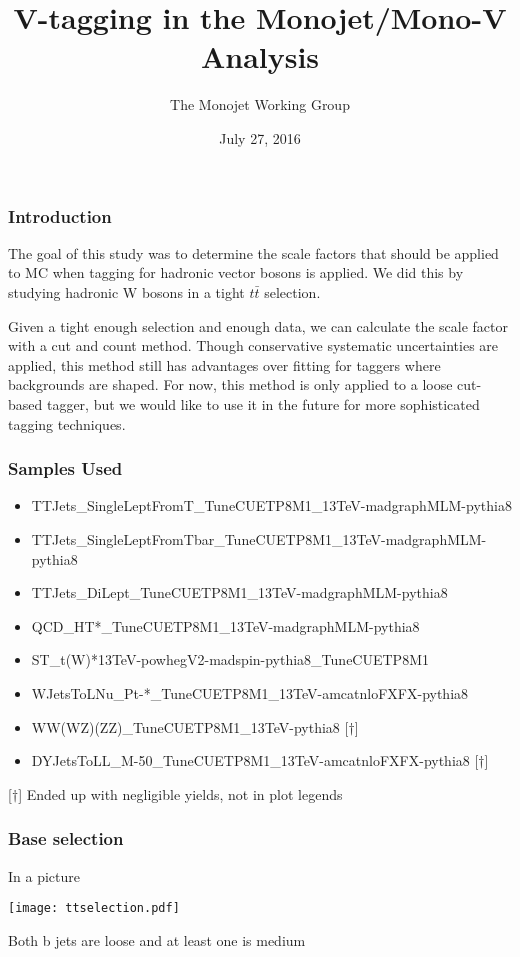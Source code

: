 \documentclass{beamer}
\author[D. Abercrombie]{
  The Monojet Working Group
}
\title{\bf \sffamily V-tagging in the Monojet/Mono-V Analysis}
\date{July 27, 2016}
\begin{document}
\begin{frame}[nonumbering]
  \titlepage
\end{frame}

\begin{frame}
  \frametitle{Introduction}
  The goal of this study was to determine the scale factors that should
  be applied to MC when tagging for hadronic vector bosons is applied.
  We did this by studying hadronic W bosons in a tight $t\bar{t}$ selection.

  \vspace{12pt}

  Given a tight enough selection and enough data, we can calculate the 
  scale factor with a cut and count method.
  Though conservative systematic uncertainties are applied, this method still has advantages
  over fitting for taggers where backgrounds are shaped.
  For now, this method is only applied to a loose cut-based tagger,
  but we would like to use it in the future for more sophisticated tagging techniques.
\end{frame}

\begin{frame}
  \frametitle{Samples Used}
  {\scriptsize
  \begin{itemize}
  \item TTJets\_SingleLeptFromT\_TuneCUETP8M1\_13TeV-madgraphMLM-pythia8
  \item TTJets\_SingleLeptFromTbar\_TuneCUETP8M1\_13TeV-madgraphMLM-pythia8
  \item TTJets\_DiLept\_TuneCUETP8M1\_13TeV-madgraphMLM-pythia8
  \item QCD\_HT*\_TuneCUETP8M1\_13TeV-madgraphMLM-pythia8
  \item ST\_t(W)*13TeV-powhegV2-madspin-pythia8\_TuneCUETP8M1
  \item WJetsToLNu\_Pt-*\_TuneCUETP8M1\_13TeV-amcatnloFXFX-pythia8
  \item WW(WZ)(ZZ)\_TuneCUETP8M1\_13TeV-pythia8 [$\dagger$]
  \item DYJetsToLL\_M-50\_TuneCUETP8M1\_13TeV-amcatnloFXFX-pythia8 [$\dagger$]
  \end{itemize}
  [$\dagger$] Ended up with negligible yields, not in plot legends
  }
\end{frame}

\begin{frame}
  \frametitle{Base selection}
  In a picture \\
  \begin{center}
  \texttt{[image: ttselection.pdf]} \\
  \end{center}
  Both b jets are loose and at least one is medium
\end{frame}
\end{document}
